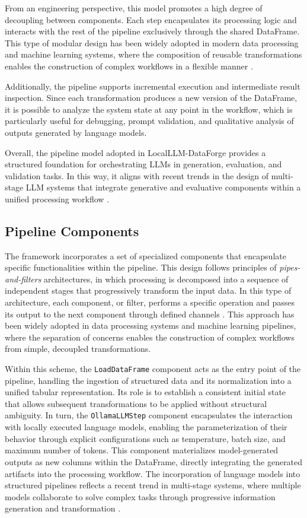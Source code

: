 \documentclass[pdflatex,sn-mathphys-num]{sn-jnl}
\theoremstyle{thmstyleone}%
\theoremstyle{thmstyletwo}%
\theoremstyle{thmstylethree}%
\begin{document}
From an engineering perspective, this model promotes a high degree of decoupling between components. Each step encapsulates its processing logic and interacts with the rest of the pipeline exclusively through the shared DataFrame. This type of modular design has been widely adopted in modern data processing and machine learning systems, where the composition of reusable transformations enables the construction of complex workflows in a flexible manner \cite{dataflow_llm}.

Additionally, the pipeline supports incremental execution and intermediate result inspection. Since each transformation produces a new version of the DataFrame, it is possible to analyze the system state at any point in the workflow, which is particularly useful for debugging, prompt validation, and qualitative analysis of outputs generated by language models.

Overall, the pipeline model adopted in LocalLLM-DataForge provides a structured foundation for orchestrating LLMs in generation, evaluation, and validation tasks. In this way, it aligns with recent trends in the design of multi-stage LLM systems that integrate generative and evaluative components within a unified processing workflow \cite{llm_pipeline_eval}.

\subsection{Pipeline Components}

The framework incorporates a set of specialized components that encapsulate specific functionalities within the pipeline. This design follows principles of \textit{pipes-and-filters} architectures, in which processing is decomposed into a sequence of independent stages that progressively transform the input data. In this type of architecture, each component, or filter, performs a specific operation and passes its output to the next component through defined channels \cite{pipes_filters}. This approach has been widely adopted in data processing systems and machine learning pipelines, where the separation of concerns enables the construction of complex workflows from simple, decoupled transformations.

Within this scheme, the \texttt{LoadDataFrame} component acts as the entry point of the pipeline, handling the ingestion of structured data and its normalization into a unified tabular representation. Its role is to establish a consistent initial state that allows subsequent transformations to be applied without structural ambiguity. In turn, the \texttt{OllamaLLMStep} component encapsulates the interaction with locally executed language models, enabling the parameterization of their behavior through explicit configurations such as temperature, batch size, and maximum number of tokens. This component materializes model-generated outputs as new columns within the DataFrame, directly integrating the generated artifacts into the processing workflow. The incorporation of language models into structured pipelines reflects a recent trend in multi-stage systems, where multiple models collaborate to solve complex tasks through progressive information generation and transformation \cite{llm_multistage}.
\end{document}
